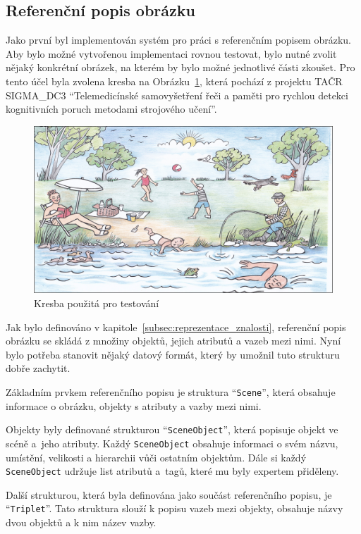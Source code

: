 \subsection{Referenční popis obrázku}\label{subsec:referencni_popis}
Jako první byl implementován systém pro práci s referenčním popisem obrázku.
Aby bylo možné vytvořenou implementaci rovnou testovat, bylo nutné zvolit nějaký konkrétní obrázek,
na kterém by bylo možné jednotlivé části zkoušet.
Pro tento účel byla zvolena kresba na Obrázku~\ref{fig:summer}, která pochází
z projektu TAČR SIGMA\_DC3 \enquote{Telemedicínské samovyšetření řeči a paměti pro rychlou detekci kognitivních poruch metodami strojového učení}.

\begin{figure}[ht!]
	\centering
	\includegraphics[width=\textwidth]{./src/imgs/summer.png}
	\caption{Kresba použitá pro testování}\label{fig:summer}
\end{figure}

Jak bylo definováno v kapitole~\ref{subsec:reprezentace_znalosti}, referenční popis obrázku se skládá z
množiny objektů, jejich atributů a vazeb mezi nimi.
Nyní bylo potřeba stanovit nějaký datový formát, který by umožnil tuto strukturu dobře zachytit.

\newpage
Základním prvkem referenčního popisu je struktura \enquote{\texttt{Scene}}, která obsahuje informace o obrázku, objekty s atributy a vazby mezi nimi.

Objekty byly definované strukturou \enquote{\texttt{SceneObject}}, která popisuje objekt ve scéně a~jeho atributy.
Každý \texttt{SceneObject} obsahuje informaci o svém názvu, umístění, velikosti a hierarchii vůči ostatním objektům.
Dále si každý \texttt{SceneObject} udržuje list atributů a~tagů, které mu byly expertem přiděleny.

Další strukturou, která byla definována jako součást referenčního popisu, je \enquote{\texttt{Triplet}}.
Tato struktura slouží k popisu vazeb mezi objekty, obsahuje názvy dvou objektů a k nim název vazby.

